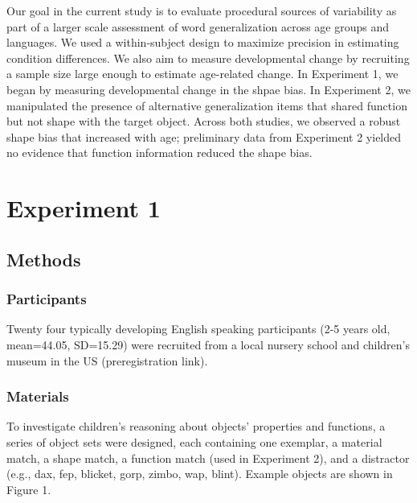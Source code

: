 \documentclass[10pt, letterpaper]{article}
\begin{document}
Our goal in the current study is to evaluate procedural sources of
variability as part of a larger scale assessment of word generalization
across age groups and languages. We used a within-subject design to
maximize precision in estimating condition differences. We also aim to
measure developmental change by recruiting a sample size large enough to
estimate age-related change. In Experiment 1, we began by measuring
developmental change in the shpae bias. In Experiment 2, we manipulated
the presence of alternative generalization items that shared function
but not shape with the target object. Across both studies, we observed a
robust shape bias that increased with age; preliminary data from
Experiment 2 yielded no evidence that function information reduced the
shape bias.

\section{Experiment 1}\label{experiment-1}

\subsection{Methods}\label{methods}

\subsubsection{Participants}\label{participants}

Twenty four typically developing English speaking participants (2-5
years old, mean=44.05, SD=15.29) were recruited from a local nursery
school and children's museum in the US (preregistration link).

\subsubsection{Materials}\label{materials}

To investigate children's reasoning about objects' properties and
functions, a series of object sets were designed, each containing one
exemplar, a material match, a shape match, a function match (used in
Experiment 2), and a distractor (e.g., dax, fep, blicket, gorp, zimbo,
wap, blint). Example objects are shown in Figure 1.
\end{document}
